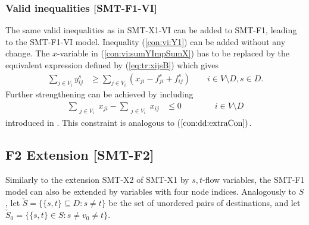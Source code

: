 \subsubsection{Valid inequalities [SMT-F1-VI]}
The same valid inequalities as in SMT-X1-VI can be added to SMT-F1, leading to the SMT-F1-VI model. Inequality (\ref{con:vi:Y1}) can be added without any change. The $x$-variable in (\ref{con:vi:sumYImpSumX}) has to be replaced by the equivalent expression defined by (\ref{eq:tr:xijsB}) which gives
\begin{subequations}[resume]
\begin{flalign}
\label{con:vi:sumYImpSumXTrans} \sum\limits_{j\in V_i }y^{s}_{ij} & \geq \sum\limits_{j\in V_i}  \left(x_{ji}-f^s_{ji}+f^s_{ij}\right)   \quad\quad   i\in V\setminus D, s\in D. 
\end{flalign}
\end{subequations}
Further strengthening can be achieved by including 
\begin{subequations}[resume]
\begin{flalign}
\label{con:pf1:flowX}  \sum\limits_{\substack{ j\in V_i }}x_{ji}-\sum\limits_{\substack{j\in V_i}}x_{ij}    & \leq 0    \qquad\qquad			  i\in V\setminus D 
\end{flalign}
\end{subequations}
introduced in \cite{Polzin}. This constraint is analogous to ($\ref{con:dd:extraCon})$.
\subsection{F2 Extension [SMT-F2]}
Similarly to the extension SMT-X2 of SMT-X1 by $s,t$-flow variables, the SMT-F1 model can also be extended by variables with four node indices. Analogously to $S$, let $\check{S}=\{\{s,t\}\subseteq D: s\neq t\}$ be the set of unordered pairs of destinations, and let $\check{S}_0=\{\{s,t\}\in S: s\neq v_0\neq t\}$. 
